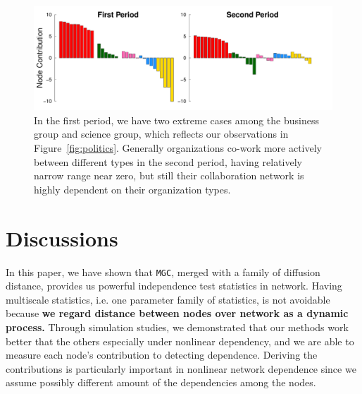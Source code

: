 \documentclass[12pt]{article}
\theoremstyle{definition}
\begin{document}
\begin{figure}[h]
	\centering
	\includegraphics[width=\linewidth]{../Figure/barplots_nolegend.pdf}	
	\caption{In the first period, we have two extreme cases among the business group and science group, which reflects our observations in Figure~\ref{fig:politics}. Generally organizations co-work more actively between different types in the second period, having relatively narrow range near zero, but still their collaboration network is highly dependent on their organization types.}
	\label{fig:barplots}
\end{figure}

\section{Discussions}
\label{sec:discussion}
	
In this paper, we have shown that \texttt{MGC}, merged with a family of diffusion distance, provides us powerful independence test statistics in network. Having multiscale statistics, i.e. one parameter family of statistics, is not avoidable because \textbf{we regard distance between nodes over network as a dynamic process.} Through simulation studies, we demonstrated that our methods work better that the others especially under nonlinear dependency, and we are able to measure each node's contribution to detecting dependence. Deriving the contributions is particularly important in nonlinear network dependence since we assume possibly different amount of the dependencies among the nodes.  
\end{document}
